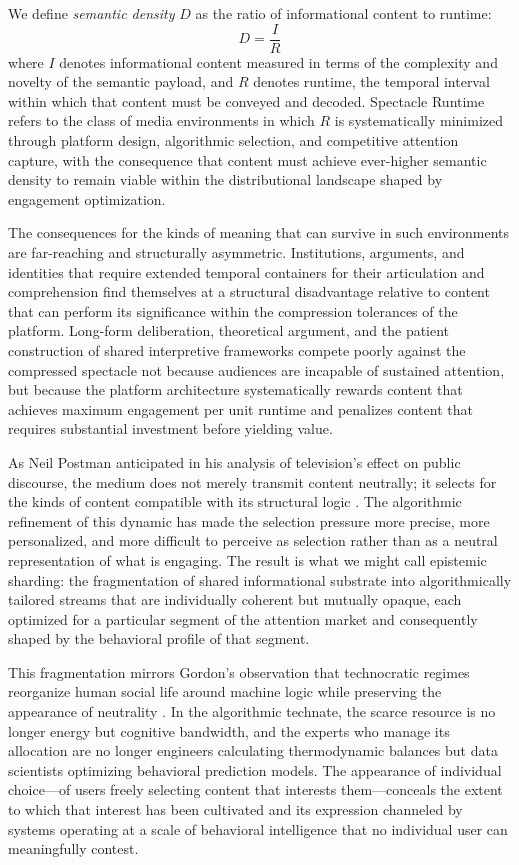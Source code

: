 \documentclass[12pt]{article}
\begin{document}
We define \emph{semantic density} $D$ as the ratio of informational content to runtime:
\[
D = \frac{I}{R}
\]
where $I$ denotes informational content measured in terms of the complexity and novelty of the semantic payload, and $R$ denotes runtime, the temporal interval within which that content must be conveyed and decoded. Spectacle Runtime refers to the class of media environments in which $R$ is systematically minimized through platform design, algorithmic selection, and competitive attention capture, with the consequence that content must achieve ever-higher semantic density to remain viable within the distributional landscape shaped by engagement optimization.

The consequences for the kinds of meaning that can survive in such environments are far-reaching and structurally asymmetric. Institutions, arguments, and identities that require extended temporal containers for their articulation and comprehension find themselves at a structural disadvantage relative to content that can perform its significance within the compression tolerances of the platform. Long-form deliberation, theoretical argument, and the patient construction of shared interpretive frameworks compete poorly against the compressed spectacle not because audiences are incapable of sustained attention, but because the platform architecture systematically rewards content that achieves maximum engagement per unit runtime and penalizes content that requires substantial investment before yielding value.

As Neil Postman anticipated in his analysis of television's effect on public discourse, the medium does not merely transmit content neutrally; it selects for the kinds of content compatible with its structural logic \citep{Postman1985}. The algorithmic refinement of this dynamic has made the selection pressure more precise, more personalized, and more difficult to perceive as selection rather than as a neutral representation of what is engaging. The result is what we might call epistemic sharding: the fragmentation of shared informational substrate into algorithmically tailored streams that are individually coherent but mutually opaque, each optimized for a particular segment of the attention market and consequently shaped by the behavioral profile of that segment.

This fragmentation mirrors Gordon's observation that technocratic regimes reorganize human social life around machine logic while preserving the appearance of neutrality \citep{GordonManyWorlds2023}. In the algorithmic technate, the scarce resource is no longer energy but cognitive bandwidth, and the experts who manage its allocation are no longer engineers calculating thermodynamic balances but data scientists optimizing behavioral prediction models. The appearance of individual choice---of users freely selecting content that interests them---conceals the extent to which that interest has been cultivated and its expression channeled by systems operating at a scale of behavioral intelligence that no individual user can meaningfully contest.
\end{document}
